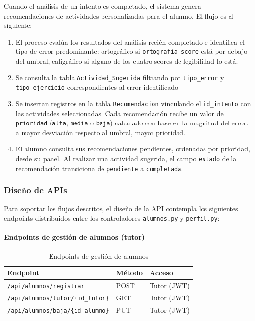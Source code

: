 Cuando el análisis de un intento es completado, el sistema genera
recomendaciones de actividades personalizadas para el alumno. El flujo
es el siguiente:

\begin{enumerate}
    \item El proceso evalúa los resultados del análisis recién
    completado e identifica el tipo de error predominante: ortográfico
    si \texttt{ortografia\_score} está por debajo del umbral, caligráfico
    si alguno de los cuatro scores de legibilidad lo está.

    \item Se consulta la tabla \texttt{Actividad\_Sugerida} filtrando por
    \texttt{tipo\_error} y \texttt{tipo\_ejercicio} correspondientes al
    error identificado.

    \item Se insertan registros en la tabla \texttt{Recomendacion}
    vinculando el \texttt{id\_intento} con las actividades seleccionadas.
    Cada recomendación recibe un valor de \texttt{prioridad}
    (\texttt{alta}, \texttt{media} o \texttt{baja}) calculado con base
    en la magnitud del error: a mayor desviación respecto al umbral,
    mayor prioridad.

    \item El alumno consulta sus recomendaciones pendientes, ordenadas
    por prioridad, desde su panel. Al realizar una actividad sugerida,
    el campo \texttt{estado} de la recomendación transiciona de
    \texttt{pendiente} a \texttt{completada}.
\end{enumerate}

\subsubsection{Diseño de APIs}

Para soportar los flujos descritos, el diseño de la API contempla los
siguientes endpoints distribuidos entre los controladores
\texttt{alumnos.py} y \texttt{perfil.py}:

\paragraph{Endpoints de gestión de alumnos (tutor)}

\begin{table}[H]
\centering
\caption{Endpoints de gestión de alumnos}
\label{tab:endpoints-alumnos}
\begin{tabular}{|l|l|l|}
\hline
\textbf{Endpoint} & \textbf{Método} & \textbf{Acceso} \\
\hline
\texttt{/api/alumnos/registrar}              & POST & Tutor (JWT) \\
\texttt{/api/alumnos/tutor/\{id\_tutor\}}    & GET  & Tutor (JWT) \\
\texttt{/api/alumnos/baja/\{id\_alumno\}}    & PUT  & Tutor (JWT) \\
\hline
\end{tabular}
\end{table}

